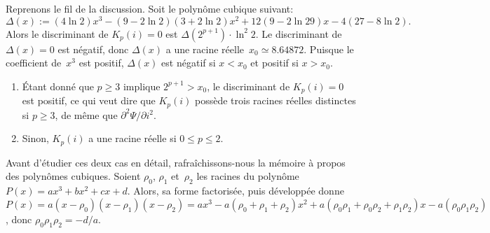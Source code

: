 Reprenons le fil de la discussion. Soit le polynôme cubique suivant:
\begin{equation*}
\Delta(x) \!:= (4\ln 2)x^3 - (9 - 2\ln 2)(3 + 2\ln 2)x^2 + 12(9 - 2\ln
29)x - 4(27 - 8\ln 2).
\end{equation*}
Alors le discriminant de \(K_p(i) = 0\) est \(\Delta(2^{p+1}) \cdot
\ln^2 2\). Le discriminant de \(\Delta(x) = 0 \) est négatif, donc
\(\Delta(x)\) a une racine réelle~\(x_0 \simeq 8.64872\). Puisque le
coefficient de~\(x^3\) est positif, \(\Delta(x)\) est négatif si \(x <
x_0\) et positif si \(x > x_0\).
\begin{enumerate}

  \item Étant donné que \(p \geqslant 3\) implique \(2^{p+1} > x_0\),
    le discriminant de \(K_p(i) = 0\) est
    positif, ce qui veut dire que \(K_p(i)\) possède trois racines
    réelles distinctes si \(p \geqslant 3\), de même que
    \(\partial^2\Psi/\partial i^2\).

  \item Sinon, \(K_p(i)\) a une racine
    réelle si \(0 \leqslant p \leqslant 2\).

\end{enumerate}
Avant d'étudier ces deux cas en détail, rafraîchissons-nous la mémoire
à propos des polynômes cubiques. Soient \(\rho_0\), \(\rho_1\)
et~\(\rho_2\) les racines du polynôme \(P(x) = ax^3 + bx^2 + cx +
d\). Alors, sa forme factorisée, puis développée donne \(P(x) =
a(x-\rho_0)(x-\rho_1)(x-\rho_2) = ax^3 - a(\rho_0+\rho_1+\rho_2)x^2 +
a(\rho_0\rho_1 + \rho_0\rho_2 + \rho_1 \rho_2)x -
a(\rho_0\rho_1\rho_2)\), donc \(\rho_0\rho_1\rho_2 = -d/a\).
